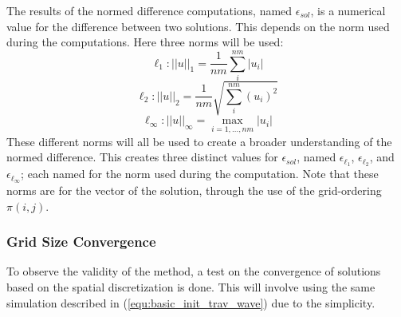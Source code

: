 The results of the normed difference computations, named $\epsilon_{sol}$, is a numerical value for the difference between two solutions.
This depends on the norm used during the computations.
Here three norms will be used:
\begin{equation}  \label{equ:norm_l1}
  \ell_1: ||u||_1 = \frac{1}{nm} \sum_{i}^{nm} |u_{i}|
\end{equation}
\begin{equation}  \label{equ:norm_l2}
  \ell_2: ||u||_2 = \frac{1}{nm} \sqrt{\sum_{i}^{nm} (u_{i})^2}
\end{equation}
\begin{equation}  \label{equ:norm_linf}
  \ell_\infty: ||u||_\infty = \max_{i=1,\ldots,nm} |u_{i}|
\end{equation}
These different norms will all be used to create a broader understanding of the normed difference.
This creates three distinct values for $\epsilon_{sol}$, named $\epsilon_{\ell_1}$, $\epsilon_{\ell_2}$, and $\epsilon_{\ell_\infty}$; each named for the norm used during the computation.
Note that these norms are for the vector of the solution, through the use of the grid-ordering $\pi(i,j)$.
  

\subsubsection{Grid Size Convergence}
To observe the validity of the method, a test on the convergence of solutions based on the spatial discretization is done.
This will involve using the same simulation described in (\ref{equ:basic_init_trav_wave}) due to the simplicity. 

